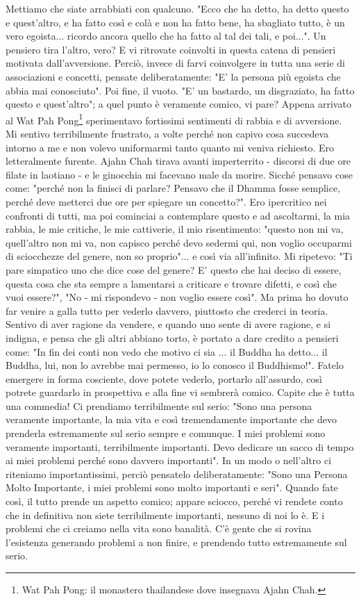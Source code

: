 Mettiamo che siate arrabbiati con qualcuno. "Ecco che ha detto, ha detto
questo e quest'altro, e ha fatto così e colà e non ha fatto bene, ha
sbagliato tutto, è un vero egoista... ricordo ancora quello che ha fatto
al tal dei tali, e poi...". Un pensiero tira l'altro, vero? E vi
ritrovate coinvolti in questa catena di pensieri motivata
dall'avversione. Perciò, invece di farvi coinvolgere in tutta una serie
di associazioni e concetti, pensate deliberatamente: "E' la persona più
egoista che abbia mai conosciuto". Poi fine, il vuoto. "E' un bastardo,
un disgraziato, ha fatto questo e quest'altro"; a quel punto è veramente
comico, vi pare? Appena arrivato al Wat Pah Pong\footnote{Wat Pah Pong: il monastero thailandese dove insegnava
Ajahn Chah.} sperimentavo
fortissimi sentimenti di rabbia e di avversione. Mi sentivo
terribilmente frustrato, a volte perché non capivo cosa succedeva
intorno a me e non volevo uniformarmi tanto quanto mi veniva richiesto.
Ero letteralmente furente. Ajahn Chah tirava avanti imperterrito -
discorsi di due ore filate in laotiano - e le ginocchia mi facevano male
da morire. Sicché pensavo cose come: "perché non la finisci di parlare?
Pensavo che il Dhamma fosse semplice, perché deve metterci due ore per
spiegare un concetto?". Ero ipercritico nei confronti di tutti, ma poi
cominciai a contemplare questo e ad ascoltarmi, la mia rabbia, le mie
critiche, le mie cattiverie, il mio risentimento: "questo non mi va,
quell'altro non mi va, non capisco perché devo sedermi qui, non voglio
occuparmi di sciocchezze del genere, non so proprio"... e così via
all'infinito. Mi ripetevo: "Ti pare simpatico uno che dice cose del
genere? E' questo che hai deciso di essere, questa cosa che sta sempre a
lamentarsi a criticare e trovare difetti, e così che vuoi essere?", "No
- mi rispondevo - non voglio essere così".
Ma prima ho dovuto far venire a galla tutto per vederlo davvero,
piuttosto che crederci in teoria. Sentivo di aver ragione da vendere, e
quando uno sente di avere ragione, e si indigna, e pensa che gli altri
abbiano torto, è portato a dare credito a pensieri come: "In fin dei
conti non vedo che motivo ci sia ... il Buddha ha detto... il Buddha,
lui, non lo avrebbe mai permesso, io lo conosco il Buddhismo!". Fatelo
emergere in forma cosciente, dove potete vederlo, portarlo all'assurdo,
così potrete guardarlo in prospettiva e alla fine vi sembrerà comico.
Capite che è tutta una commedia! Ci prendiamo terribilmente sul serio:
"Sono una persona veramente importante, la mia vita e così tremendamente
importante che devo prenderla estremamente sul serio sempre e comunque.
I miei problemi sono veramente importanti, terribilmente importanti.
Devo dedicare un sacco di tempo ai miei problemi perché sono davvero
importanti". In un modo o nell'altro ci riteniamo importantissimi,
perciò pensatelo deliberatamente: "Sono una Persona Molto Importante, i
miei problemi sono molto importanti e seri". Quando fate così, il tutto
prende un aspetto comico; appare sciocco, perché vi rendete conto che in
definitiva non siete terribilmente importanti, nessuno di noi lo è. E i
problemi che ci creiamo nella vita sono banalità. C'è gente che si
rovina l'esistenza generando problemi a non finire, e prendendo tutto
estremamente sul serio.

